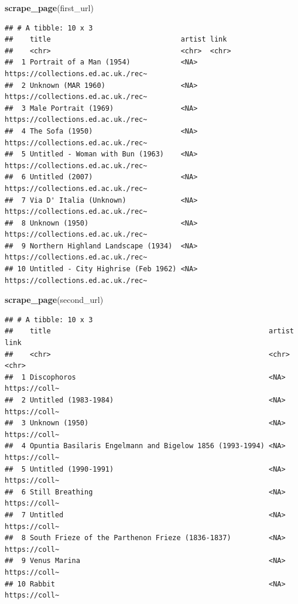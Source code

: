 \documentclass[
]{article}
\newenvironment{Shaded}{\begin{snugshade}}{\end{snugshade}}
\newcommand{\FunctionTok}[1]{\textcolor[rgb]{0.13,0.29,0.53}{\textbf{#1}}}
\newcommand{\NormalTok}[1]{#1}
\begin{document}
\begin{Shaded}
\begin{Highlighting}[]
\FunctionTok{scrape\_page}\NormalTok{(first\_url)}
\end{Highlighting}
\end{Shaded}

\begin{verbatim}
## # A tibble: 10 x 3
##    title                               artist link                              
##    <chr>                               <chr>  <chr>                             
##  1 Portrait of a Man (1954)            <NA>   https://collections.ed.ac.uk./rec~
##  2 Unknown (MAR 1960)                  <NA>   https://collections.ed.ac.uk./rec~
##  3 Male Portrait (1969)                <NA>   https://collections.ed.ac.uk./rec~
##  4 The Sofa (1950)                     <NA>   https://collections.ed.ac.uk./rec~
##  5 Untitled - Woman with Bun (1963)    <NA>   https://collections.ed.ac.uk./rec~
##  6 Untitled (2007)                     <NA>   https://collections.ed.ac.uk./rec~
##  7 Via D' Italia (Unknown)             <NA>   https://collections.ed.ac.uk./rec~
##  8 Unknown (1950)                      <NA>   https://collections.ed.ac.uk./rec~
##  9 Northern Highland Landscape (1934)  <NA>   https://collections.ed.ac.uk./rec~
## 10 Untitled - City Highrise (Feb 1962) <NA>   https://collections.ed.ac.uk./rec~
\end{verbatim}

\begin{Shaded}
\begin{Highlighting}[]
\FunctionTok{scrape\_page}\NormalTok{(second\_url)}
\end{Highlighting}
\end{Shaded}

\begin{verbatim}
## # A tibble: 10 x 3
##    title                                                    artist link         
##    <chr>                                                    <chr>  <chr>        
##  1 Discophoros                                              <NA>   https://coll~
##  2 Untitled (1983-1984)                                     <NA>   https://coll~
##  3 Unknown (1950)                                           <NA>   https://coll~
##  4 Opuntia Basilaris Engelmann and Bigelow 1856 (1993-1994) <NA>   https://coll~
##  5 Untitled (1990-1991)                                     <NA>   https://coll~
##  6 Still Breathing                                          <NA>   https://coll~
##  7 Untitled                                                 <NA>   https://coll~
##  8 South Frieze of the Parthenon Frieze (1836-1837)         <NA>   https://coll~
##  9 Venus Marina                                             <NA>   https://coll~
## 10 Rabbit                                                   <NA>   https://coll~
\end{verbatim}
\end{document}
